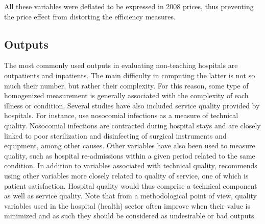 \documentclass[11pt,a4paper,oneside]{article}
\begin{document}
All these variables were deflated to be expressed in 2008 prices, thus 
preventing the price effect from distorting the efficiency measures.

\subsection{Outputs}
\label{sec:outputs}


The most commonly used outputs in evaluating non-teaching hospitals are outpatients and inpatients. The main difficulty in computing the latter is not so much their number, but rather their complexity. For this reason, some type of homogenized measurement is generally associated with the complexity of each illness or condition. Several studies have also included service quality provided by hospitals. For instance, \cite{Prior2001} use nosocomial infections as a measure of technical quality. Nosocomial infections are contracted during hospital stays and are closely linked to poor sterilization and disinfecting of surgical instruments and equipment, among other causes. Other variables have also been used to measure quality, such as hospital re-admissions within a given period related to the same condition. In addition to variables associated with technical quality, \cite{Vuori:1991vz} recommends using other variables more closely related to quality of service, one of which is patient satisfaction. Hospital quality would thus comprise a technical component as well as service quality. Note that from a methodological point of view, quality variables used in the hospital (health) sector often improve when their value is minimized and as such they should be considered as undesirable or bad outputs.
\end{document}
